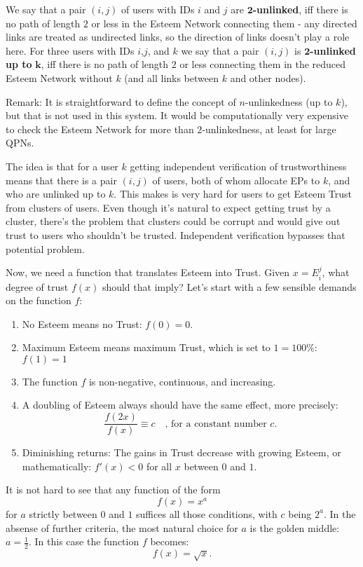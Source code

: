 \documentclass[a4paper,12pt]{scrartcl}
\begin{document}
We say that a pair $(i,j)$ of users with IDs $i$ and $j$ are $\mathbf{2}$\textbf{-unlinked}, iff there is no path of length $2$ or less in the Esteem Network connecting them - any directed links are treated as undirected links, so the direction of links doesn't play a role here. For three users with IDs $i$,$j$, and $k$ we say that a pair $(i,j)$ is $\mathbf{2}$\textbf{-unlinked up to} $\mathbf{k}$, iff there is no path of length $2$ or less connecting them in the reduced Esteem Network without $k$ (and all links between $k$ and other nodes).

Remark: It is straightforward to define the concept of $n$-unlinkedness (up to $k$), but that is not used in this system. It would be computationally very expensive to check the Esteem Network for more than $2$-unlinkedness, at least for large QPNs.

The idea is that for a user $k$ getting independent verification of trustworthiness means that there is a pair $(i,j)$ of users, both of whom allocate EPs to $k$, and who are unlinked up to $k$. This makes is very hard for users to get Esteem Trust from clusters of users. Even though it's natural to expect getting trust by a cluster, there's the problem that clusters could be corrupt and would give out trust to users who shouldn't be trusted. Independent verification bypasses that potential problem.

Now, we need a function that translates Esteem into Trust. Given $x= E^j_i$, what degree of trust $f(x)$ should that imply? Let's start with a few sensible demands on the function $f$:
\begin{enumerate}
 \item No Esteem means no Trust: $f(0)=0$.
 \item Maximum Esteem means maximum Trust, which is set to $1 = 100 \%$: $f(1) = 1$
 \item The function $f$ is non-negative, continuous, and increasing.
 \item A doubling of Esteem always should have the same effect, more precisely: $$\frac{f(2x)}{f(x)} \equiv c \quad\mbox{, for a constant number $c$.}$$
 \item Diminishing returns: The gains in Trust decrease with growing Esteem, or mathematically: $f'(x) < 0$ for all $x$ between $0$ and $1$.
\end{enumerate}
It is not hard to see that any function of the form
$$f(x) = x^a$$
for $a$ strictly between $0$ and $1$ suffices all those conditions, with $c$ being $2^a$. In the absense of further criteria, the most natural choice for $a$ is the golden middle: $a=\frac{1}{2}$. In this case the function $f$ becomes:
$$f(x) = \sqrt{x}.$$
\end{document}
